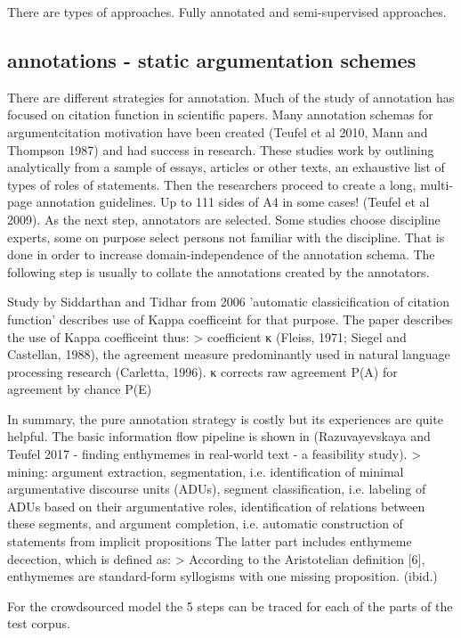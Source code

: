 \documentclass{article}
\begin{document}
There are types of approaches. Fully annotated and  semi-supervised approaches.

\subsection{annotations - static argumentation schemes}
There are different strategies for annotation. Much of the study of annotation has focused on citation function in scientific papers.
Many annotation schemas for argumentcitation motivation have been created (Teufel et al 2010, Mann and Thompson 1987) and had success in research.
These studies work by outlining analytically from a sample of essays, articles or other texts, an exhaustive list of types of roles of statements.
Then the researchers proceed to create a long, multi-page annotation guidelines. Up to 111 sides of A4 in some cases! (Teufel et al 2009).
As the next step, annotators are selected. Some studies choose discipline experts, some on purpose select persons not familiar with the discipline.
That is done in order to increase domain-independence of the annotation schema.
The following step is usually to collate the annotations created by the annotators. 

Study by Siddarthan and Tidhar from 2006 'automatic classicification of citation function' describes use of Kappa coefficeint for that purpose.
The paper describes the use of Kappa coefficeint thus:
> coefficient κ (Fleiss, 1971; Siegel and Castellan, 1988), the agreement measure predominantly used in natural language processing research (Carletta, 1996). κ corrects raw agreement P(A) for agreement by chance P(E)

In summary, the pure annotation strategy is costly but its experiences are quite helpful. The basic information flow pipeline is shown in (Razuvayevskaya and Teufel 2017 - finding enthymemes in real-world text - a feasibility study).
> mining: argument extraction, segmentation, i.e. identification of minimal argumentative discourse units (ADUs), segment classification, i.e. labeling of ADUs based on their argumentative roles, identification of relations between these segments, and argument completion, i.e. automatic construction of statements from implicit propositions
The latter part includes enthymeme decection, which is defined as:
> According to the Aristotelian definition [6], enthymemes are standard-form syllogisms with one missing proposition.  (ibid.)

For the crowdsourced model the 5 steps can be traced for each of the parts of the test corpus. 
\end{document}
